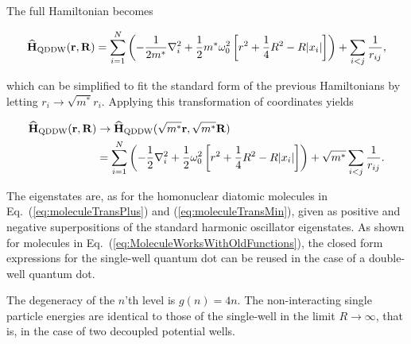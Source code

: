 The full Hamiltonian becomes

\begin{equation}
  {\bf\widehat{H}}_{\mathrm{QDDW}}(\mathbf{r}, \mathbf{R}) = \sum_{i=1}^N \left(-\frac{1}{2m^\ast}\nabla_i^2 + \frac{1}{2}m^\ast \omega_0^2 \left[r^2 + \frac{1}{4}R^2 - R|x_i|\right]  \right) + \sum_{i<j} \frac{1}{r_{ij}},
\end{equation}

which can be simplified to fit the standard form of the previous Hamiltonians by letting $r_i\to\sqrt{m^\ast}r_i$. Applying this transformation of coordinates yields

\begin{align}
  {\bf\widehat{H}}_{\mathrm{QDDW}}(\mathbf{r}, \mathbf{R}) &\to {\bf\widehat{H}}_{\mathrm{QDDW}}(\sqrt{m^\ast}\mathbf{r}, \sqrt{m^\ast}\mathbf{R}) \\
   &=\sum_{i=1}^N \left(-\frac{1}{2}\nabla_i^2 + \frac{1}{2} \omega_0^2 \left[r^2 + \frac{1}{4}R^2 - R|x_i|\right]  \right) + \sqrt{m^\ast}\sum_{i<j} \frac{1}{r_{ij}}.
\end{align}

The eigenstates are, as for the homonuclear diatomic molecules in Eq.~(\ref{eq:moleculeTransPlus}) and (\ref{eq:moleculeTransMin}), given as positive and negative superpositions of the standard harmonic oscillator eigenstates. As shown for molecules in Eq.~(\ref{eq:MoleculeWorksWithOldFunctions}), the closed form expressions for the single-well quantum dot can be reused in the case of a double-well quantum dot. 

The degeneracy of the $n$'th level is $g(n) = 4n$. The non-interacting single particle energies are identical to those of the single-well in the limit $R\to\infty$, that is, in the case of two decoupled potential wells.

